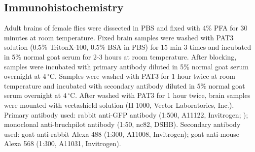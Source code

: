 \subsection*{Immunohistochemistry}

Adult brains of female flies were dissected in PBS and fixed with 4\% PFA for 30 minutes at room temperature.
Fixed brain samples were washed with PAT3 solution (0.5\% TritonX-100, 0.5\% BSA in PBS) for 15 min 3 times and incubated in 5\% normal goat serum for 2-3 hours at room temperature.
After blocking, samples were incubated with primary antibody diluted in 5\% normal goat serum overnight at $4\,^{\circ}\mathrm{C}$.
Samples were washed with PAT3 for 1 hour twice at room temperature and incubated with secondary antibody diluted in 5\% normal goat serum overnight at $4\,^{\circ}\mathrm{C}$.
After washed with PAT3 for 1 hour twice, brain samples were mounted with vectashield solution (H-1000, Vector Laboratories, Inc.).
Primary antibody used: rabbit anti-GFP antibody (1:500, A11122, Invitrogen; ); monoclonal anti-bruchpilot antibody (1:50, nc82, DSHB).
Secondary antibody used: goat anti-rabbit Alexa 488 (1:300, A11008, Invitrogen); goat anti-mouse Alexa 568 (1:300, A11031, Invitrogen).
    
    
  